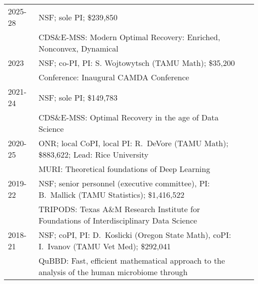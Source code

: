 \documentclass[11pt]{article}
\begin{document}

\begin{tabular}{lll}
2025-28 & NSF; sole PI; \$239,850\\
& \hspace{-15mm}
{\small CDS\&E-MSS:} Modern Optimal Recovery: Enriched, Nonconvex, Dynamical\\
2023 & NSF; co-PI,  PI: S. Wojtowytsch (TAMU Math); \$35,200\\
& \hspace{-15mm}
{\small Conference:} Inaugural CAMDA Conference\\
2021-24 & NSF; sole PI; \$149,783\\
& \hspace{-15mm}
{\small CDS\&E-MSS:} Optimal Recovery in the age of Data Science\\
2020-25 & ONR; local CoPI, local PI: R.~DeVore (TAMU Math); \$883,622;
Lead: Rice University\\
& \hspace{-15mm}
{\small MURI:} Theoretical foundations of Deep Learning \\
2019-22 & NSF; senior personnel (executive committee), PI: B.~Mallick (TAMU  Statistics);  \$1,416,522 \\
& \hspace{-15mm}
{\small TRIPODS:} Texas A\&M Research Institute for Foundations of Interdisciplinary Data Science\\
2018-21 & NSF; coPI, PI: D.~Koslicki (Oregon State Math), coPI: I.~Ivanov (TAMU Vet Med); 
\$292,041 \\
& \hspace{-15mm}
{\small QuBBD:} Fast, efficient mathematical approach to the analysis of the
human microbiome through\\ 

\end{tabular}
\end{document}
